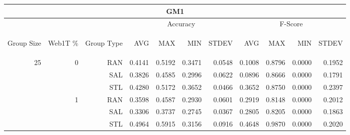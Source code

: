 \begin{center}
\begin{table}[htbp] 
 \begin{center}
\begin{tabular}{ | r | r | r | r | r | r | r | r | r | r | r |}
\hline
\multicolumn{11}{|c|}{GM1}\\
\hline
 & & & \multicolumn{4}{|c|}{Accuracy} & \multicolumn{4}{|c|}{F-Score}\\ \cline{4-11}
\begin{sideways}Group Size\end{sideways} & \begin{sideways}Web1T \%\end{sideways} & \begin{sideways}Group Type\end{sideways} & \begin{sideways}AVG\end{sideways} & \begin{sideways}MAX\end{sideways} & \begin{sideways}MIN\end{sideways} & \begin{sideways}STDEV\end{sideways} & \begin{sideways}AVG\end{sideways} & \begin{sideways}MAX\end{sideways} & \begin{sideways}MIN\end{sideways} & \begin{sideways}STDEV\end{sideways}\\
\hline
\multirow{18}{*}{25}
 & \multirow{3}{*}{0} & RAN & 0.4141 & 0.5192 & 0.3471 & 0.0548 & 0.1008 & 0.8796 & 0.0000 & 0.1952\\ \cline{3-11}
 &   & SAL & 0.3826 & 0.4585 & 0.2996 & 0.0622 & 0.0896 & 0.8666 & 0.0000 & 0.1791\\ \cline{3-11}
 &   & STL & 0.4280 & 0.5172 & 0.3652 & 0.0466 & 0.3652 & 0.8750 & 0.0000 & 0.2397\\ \cline{2-11}
 & \multirow{3}{*}{1} & RAN & 0.3598 & 0.4587 & 0.2930 & 0.0601 & 0.2919 & 0.8148 & 0.0000 & 0.2012\\ \cline{3-11}
 &   & SAL & 0.3306 & 0.3737 & 0.2745 & 0.0367 & 0.2805 & 0.8205 & 0.0000 & 0.1863\\ \cline{3-11}
 &   & STL & 0.4964 & 0.5915 & 0.3156 & 0.0916 & 0.4648 & 0.9870 & 0.0000 & 0.2020\\ \cline{2-11}

\end{tabular}
\end{center}
\end{table}
\end{center}
